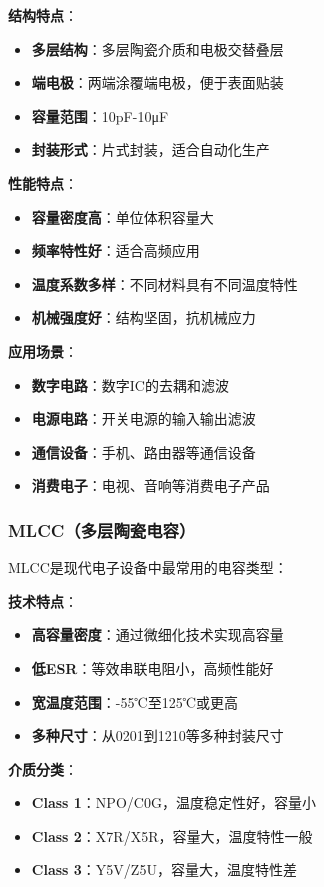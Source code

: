 \documentclass[12pt,UTF8]{ctexbook}
\begin{document}
\textbf{结构特点}：
\begin{itemize}[leftmargin=3.5em]
    \item \textbf{多层结构}：多层陶瓷介质和电极交替叠层
    \item \textbf{端电极}：两端涂覆端电极，便于表面贴装
    \item \textbf{容量范围}：10pF-10μF
    \item \textbf{封装形式}：片式封装，适合自动化生产
\end{itemize}

\textbf{性能特点}：
\begin{itemize}[leftmargin=3.5em]
    \item \textbf{容量密度高}：单位体积容量大
    \item \textbf{频率特性好}：适合高频应用
    \item \textbf{温度系数多样}：不同材料具有不同温度特性
    \item \textbf{机械强度好}：结构坚固，抗机械应力
\end{itemize}

\textbf{应用场景}：
\begin{itemize}[leftmargin=3.5em]
    \item \textbf{数字电路}：数字IC的去耦和滤波
    \item \textbf{电源电路}：开关电源的输入输出滤波
    \item \textbf{通信设备}：手机、路由器等通信设备
    \item \textbf{消费电子}：电视、音响等消费电子产品
\end{itemize}

\subsubsection{MLCC（多层陶瓷电容）}

MLCC是现代电子设备中最常用的电容类型：

\textbf{技术特点}：
\begin{itemize}[leftmargin=3.5em]
    \item \textbf{高容量密度}：通过微细化技术实现高容量
    \item \textbf{低ESR}：等效串联电阻小，高频性能好
    \item \textbf{宽温度范围}：-55℃至125℃或更高
    \item \textbf{多种尺寸}：从0201到1210等多种封装尺寸
\end{itemize}

\textbf{介质分类}：
\begin{itemize}[leftmargin=3.5em]
    \item \textbf{Class 1}：NPO/C0G，温度稳定性好，容量小
    \item \textbf{Class 2}：X7R/X5R，容量大，温度特性一般
    \item \textbf{Class 3}：Y5V/Z5U，容量大，温度特性差
\end{itemize}
\end{document}
